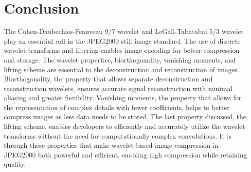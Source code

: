 \documentclass{article}
\begin{document}
\section{Conclusion}
The Cohen-Daubechies-Feauveau 9/7 wavelet and LeGall-Tabatabai 5/3 wavelet play an essential roll in the JPEG2000 still image standard. The use of discrete wavelet transforms and filtering enables image encoding for better compression and storage. The wavelet properties, biorthogonality, vanishing moments, and lifting scheme are essential to the deconstruction and reconstruction of images. Biorthogonality, the property that allows separate deconstruction and reconstruction wavelets, ensures accurate signal reconstruction with minimal aliasing and greater flexibility. Vanishing moments, the property that allows for the representation of complex details with fewer coefficients, helps to better compress images as less data needs to be stored. The last property discussed, the lifting scheme, enables developers to efficiently and accurately utilize the wavelet transforms without the need for computationally complex convolutions. It is through these properties that make wavelet-based image compression in JPEG2000 both powerful and efficient, enabling high compression while retaining quality.
\end{document}
